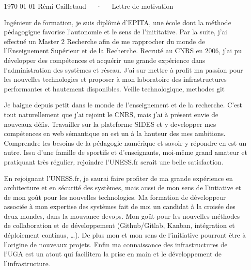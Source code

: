\documentclass[11pt, a4paper]{awesome-cv}
\begin{document}
\makecvheader[R]

\makecvfooter
  {\today}
  {Rémi Cailletaud~~~·~~~Lettre de motivation}
  {}

\makelettertitle

\begin{cvletter}

Ingénieur de formation, je suis diplômé d'EPITA, une école dont la méthode pédagogigue favorise l'autonomie et le sens de l'inititative. Par la suite, j'ai effectué un Master 2 Recherche afin de me rapprocher du monde de l'Enseignement Supérieur et de la Recherche. Recruté au CNRS en 2006, j'ai pu développer des compétences et acquérir une grande expérience dans l'administration des systèmes et réseau. J'ai sur mettre à profit ma passion pour les nouvelles technologies et proposer à mon laboratoire des infrastructures performantes et hautement disponibles. Veille technologique, methodes git


Je baigne depuis petit dans le monde de l'enseignement et de la recherche. C'est tout naturellement que j'ai rejoint le CNRS, mais j'ai à présent envie de nouveaux défis. Travailler sur la plateforme SIDES et y developper mes compétences en web sémantique en est un à la hauteur des mes ambitions. Comprendre les besoins de la pédagogie numérique et savoir y répondre en est un autre.	
Issu d'une famille de sportifs et d'enseignants, moi-même grand amateur et pratiquant très régulier, rejoindre l'UNESS.fr serait une belle satisfaction.

	En rejoignant l'UNESS.fr, je saurai faire profiter de ma grande expérience en architecture et en sécurité des systèmes, mais aussi de mon sens de l'intiative et de mon goût pour les nouvelles technologies. Ma formation de développeur associée à mon expertise des systèmes fait de moi un candidat à la croisée des deux mondes, dans la mouvance devops. Mon goût pour les nouvelles méthodes de collaboration et  de développement (Github/Gitlab, Kanban, intégration et déploiement continus, \ldots). De plus mon  et mon sens de l'initiative pourront être à l'origine de nouveaux projets.
	Enfin ma connaissance des infrastructures de l'UGA est un atout qui facilitera la prise en main et le développement de l'infrastructure.

\end{cvletter}


\makeletterclosing
\end{document}
